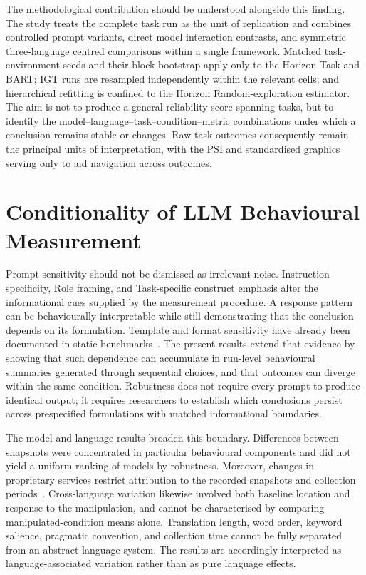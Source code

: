\documentclass[logo,msc]{infthesis}
\begin{document}
The methodological contribution should be understood alongside this finding. The study treats the complete task run as the unit of replication and combines controlled prompt variants, direct model interaction contrasts, and symmetric three-language centred comparisons within a single framework. Matched task-environment seeds and their block bootstrap apply only to the Horizon Task and BART; IGT runs are resampled independently within the relevant cells; and hierarchical refitting is confined to the Horizon Random-exploration estimator. The aim is not to produce a general reliability score spanning tasks, but to identify the model--language--task--condition--metric combinations under which a conclusion remains stable or changes. Raw task outcomes consequently remain the principal units of interpretation, with the PSI and standardised graphics serving only to aid navigation across outcomes.

\section{Conditionality of LLM Behavioural Measurement}

Prompt sensitivity should not be dismissed as irrelevant noise. Instruction specificity, Role framing, and Task-specific construct emphasis alter the informational cues supplied by the measurement procedure. A response pattern can be behaviourally interpretable while still demonstrating that the conclusion depends on its formulation. Template and format sensitivity have already been documented in static benchmarks~\cite{Sclar2024PromptFormatting,Mizrahi2024MultiPrompt,Hua2025FlawArtifact}. The present results extend that evidence by showing that such dependence can accumulate in run-level behavioural summaries generated through sequential choices, and that outcomes can diverge within the same condition. Robustness does not require every prompt to produce identical output; it requires researchers to establish which conclusions persist across prespecified formulations with matched informational boundaries.

The model and language results broaden this boundary. Differences between snapshots were concentrated in particular behavioural components and did not yield a uniform ranking of models by robustness. Moreover, changes in proprietary services restrict attribution to the recorded snapshots and collection periods~\cite{Chen2024ChatGPTBehavior,Palmer2024ProprietaryModels}. Cross-language variation likewise involved both baseline location and response to the manipulation, and cannot be characterised by comparing manipulated-condition means alone. Translation length, word order, keyword salience, pragmatic convention, and collection time cannot be fully separated from an abstract language system. The results are accordingly interpreted as language-associated variation rather than as pure language effects.
\end{document}

